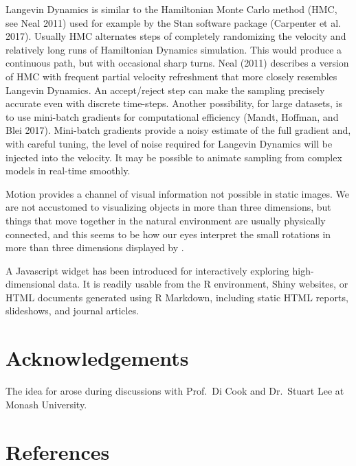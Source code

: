 Langevin Dynamics is similar to the Hamiltonian Monte Carlo method (HMC, see Neal 2011) used for example by the Stan software package (Carpenter et al. 2017). Usually HMC alternates steps of completely randomizing the velocity and relatively long runs of Hamiltonian Dynamics simulation. This would produce a continuous path, but with occasional sharp turns. Neal (2011) describes a version of HMC with frequent partial velocity refreshment that more closely resembles Langevin Dynamics. An accept/reject step can make the sampling precisely accurate even with discrete time-steps. Another possibility, for large datasets, is to use mini-batch gradients for computational efficiency (Mandt, Hoffman, and Blei 2017). Mini-batch gradients provide a noisy estimate of the full gradient and, with careful tuning, the level of noise required for Langevin Dynamics will be injected into the velocity. It may be possible to animate sampling from complex models in real-time smoothly.

Motion provides a channel of visual information not possible in static images. We are not accustomed to visualizing objects in more than three dimensions, but things that move together in the natural environment are usually physically connected, and this seems to be how our eyes interpret the small rotations in more than three dimensions displayed by .

A Javascript widget has been introduced for interactively exploring high-dimensional data. It is readily usable from the R environment, Shiny websites, or HTML documents generated using R Markdown, including static HTML reports, slideshows, and journal articles.

\hypertarget{acknowledgements}{%
\section{Acknowledgements}\label{acknowledgements}}

The idea for  arose during discussions with Prof.~Di Cook and Dr.~Stuart Lee at Monash University.

\hypertarget{references}{%
\section*{References}\label{references}}

